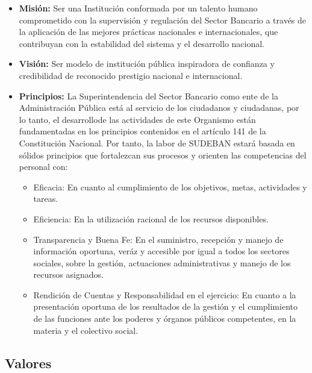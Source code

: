 \documentclass[10pt,]{article}
\providecommand{\tightlist}{%
  \setlength{\itemsep}{0pt}\setlength{\parskip}{0pt}}
\begin{document}
\begin{itemize}
\tightlist
\item
  \textbf{Misión:} Ser una Institución conformada por un talento humano
  comprometido con la supervisión y regulación del Sector Bancario a
  través de la aplicación de las mejores prácticas nacionales e
  internacionales, que contribuyan con la estabilidad del sistema y el
  desarrollo nacional.
\item
  \textbf{Visión:} Ser modelo de institución pública inspiradora de
  confianza y credibilidad de reconocido prestigio nacional e
  internacional.
\item
  \textbf{Principios:} La Superintendencia del Sector Bancario como ente
  de la Administración Pública está al servicio de los ciudadanos y
  ciudadanas, por lo tanto, el desarrollode las actividades de este
  Organismo están fundamentadas en los principios contenidos en el
  artículo 141 de la Constitución Nacional. Por tanto, la labor de
  SUDEBAN estará basada en sólidos principios que fortalezcan sus
  procesos y orienten las competencias del personal con:

  \begin{itemize}
  \tightlist
  \item
    Eficacia: En cuanto al cumplimiento de los objetivos, metas,
    actividades y tareas.
  \item
    Eficiencia: En la utilización racional de los recursos disponibles.
  \item
    Transparencia y Buena Fe: En el suministro, recepción y manejo de
    información oportuna, veráz y accesible por igual a todos los
    sectores sociales, sobre la gestión, actuaciones administrativas y
    manejo de los recursos asignados.
  \item
    Rendición de Cuentas y Responsabilidad en el ejercicio: En cuanto a
    la presentación oportuna de los resultados de la gestión y el
    cumplimiento de las funciones ante los poderes y órganos públicos
    competentes, en la materia y el colectivo social.
  \end{itemize}
\end{itemize}

\hypertarget{valores}{%
\subsection{Valores}\label{valores}}
\end{document}
